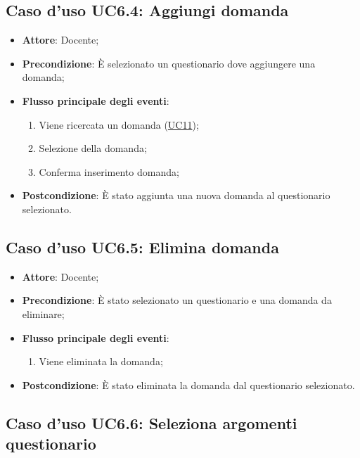 \documentclass[12pt,a4paper]{article}
\begin{document}
\subsection{Caso d'uso UC6.4: Aggiungi domanda}

\begin{itemize}

\item \textbf{Attore}: Docente; 
\item \textbf{Precondizione}: È selezionato un questionario dove aggiungere una domanda;

\item \textbf{Flusso principale degli eventi}:
\begin{enumerate}
	\item Viene ricercata un domanda (\hyperlink{UC11}{UC11});
	\item Selezione della domanda;
	\item Conferma inserimento domanda;
	
\end{enumerate}
\item \textbf{Postcondizione}: È stato aggiunta una nuova domanda al questionario selezionato.
\end{itemize}
\hypertarget{UC6.5}{}
\subsection{Caso d'uso UC6.5: Elimina domanda}

\begin{itemize}

\item \textbf{Attore}: Docente; 
\item \textbf{Precondizione}: È stato selezionato un questionario e una domanda da eliminare;

\item \textbf{Flusso principale degli eventi}:
\begin{enumerate}
	\item Viene eliminata la domanda;
	
\end{enumerate}
\item \textbf{Postcondizione}: È stato eliminata la domanda dal questionario selezionato.
\end{itemize}
\hypertarget{UC6.6}{}
\subsection{Caso d'uso UC6.6: Seleziona argomenti questionario}
\end{document}
